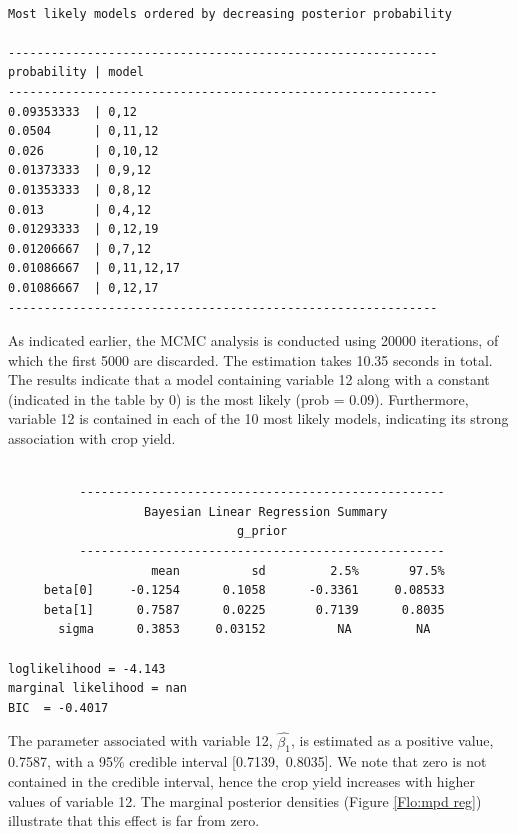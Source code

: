 \documentclass[article]{jss}
\begin{document}
%
\begin{minipage}[t]{1\columnwidth}%
\begin{verbatim}

Most likely models ordered by decreasing posterior probability

------------------------------------------------------------
probability | model       
------------------------------------------------------------
0.09353333  | 0,12        
0.0504      | 0,11,12     
0.026       | 0,10,12     
0.01373333  | 0,9,12      
0.01353333  | 0,8,12      
0.013       | 0,4,12      
0.01293333  | 0,12,19     
0.01206667  | 0,7,12      
0.01086667  | 0,11,12,17  
0.01086667  | 0,12,17     
------------------------------------------------------------

\end{verbatim}%
\end{minipage}

As indicated earlier, the MCMC analysis is conducted using 20000 iterations, of which the
first 5000 are discarded. The estimation takes 10.35 seconds in total.
The results indicate that a model containing variable 12 along with a
constant (indicated in the table by 0) is the most likely (prob = 0.09). Furthermore, variable 12 is
contained in each of the 10 most likely models, indicating its strong
association with crop yield.

%
\begin{minipage}[t]{1\columnwidth}%
\begin{verbatim}

          ---------------------------------------------------           
                   Bayesian Linear Regression Summary                   
                                g_prior                                 
          ---------------------------------------------------           
                    mean          sd         2.5%       97.5%
     beta[0]     -0.1254      0.1058      -0.3361     0.08533
     beta[1]      0.7587      0.0225       0.7139      0.8035
       sigma      0.3853     0.03152          NA         NA

loglikelihood = -4.143      
marginal likelihood = nan         
BIC  = -0.4017     

\end{verbatim}%
\end{minipage}

The parameter associated with variable 12, $\hat{\beta_{1}}$, is
estimated as a positive value, 0.7587, with a 95\% credible interval
{[}0.7139,~0.8035{]}. We note that zero is not contained in the
credible interval, hence the crop yield increases with higher values
of variable 12. The marginal posterior densities (Figure \ref{Flo:mpd
  reg}) illustrate that this effect is far from zero. %
\end{document}
